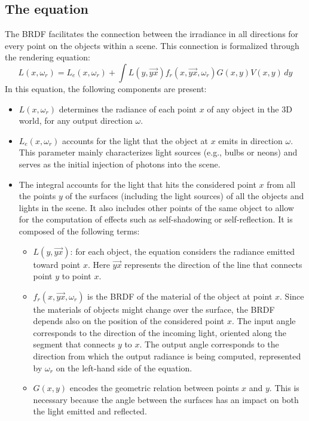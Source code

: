 \subsection{The equation}
The BRDF facilitates the connection between the irradiance in all directions for every point on the objects within a scene. 
This connection is formalized through the rendering equation:
\[L(x,\omega_r)=L_e(x,\omega_r)+\int L(y,\overrightarrow{yx}) f_r(x,\overrightarrow{yx},\omega_r)G(x,y)V(x,y)\, dy\]
In this equation, the following components are present:
\begin{itemize}
    \item $L(x,\omega_r)$ determines the radiance of each point $x$ of any object in the 3D world, for any output direction $\omega$.
    \item $L_e(x,\omega_r)$ accounts for the light that the object at $x$ emits in direction $\omega$. 
        This parameter mainly characterizes light sources (e.g., bulbs or neons) and serves as the initial injection of photons into the scene.
    \item The integral accounts for the light that hits the considered point $x$ from all the points $y$ of the surfaces (including the light sources) of all the objects and lights in the scene. 
        It also includes other points of the same object to allow for the computation of effects such as self-shadowing or self-reflection. 
        It is composed of the following terms:
        \begin{itemize}
            \item $L(y,\overrightarrow{yx})$: for each object, the equation considers the radiance emitted toward point $x$. 
                Here $\overrightarrow{yx}$ represents the direction of the line that connects point $y$ to point $x$.
            \item $f_r(x,\overrightarrow{yx},\omega_r)$ is the BRDF of the material of the object at point $x$. 
                Since the materials of objects might change over the surface, the BRDF depends also on the position of the considered point $x$. 
                The input angle corresponds to the direction of the incoming light, oriented along the segment that connects $y$ to $x$. 
                The output angle corresponds to the direction from which the output radiance is being computed, represented by $\omega_r$ on the left-hand side of the equation.
            \item $G(x,y)$ encodes the geometric relation between points $x$ and $y$. 
                This is necessary because the angle between the surfaces has an impact on both the light emitted and reflected. 

\end{itemize}
\end{itemize}
